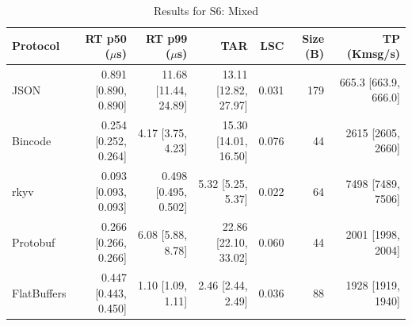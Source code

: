\begin{table}[htbp]
\centering
\caption{Results for S6: Mixed}
\label{tab:results_mixed}
\begin{tabular}{l r r r r r r}
\hline
Protocol & RT p50 ($\mu$s) & RT p99 ($\mu$s) & TAR & LSC & Size (B) & TP (Kmsg/s) \\
\hline
  JSON & 0.891 [0.890, 0.890] & 11.68 [11.44, 24.89] & 13.11 [12.82, 27.97] & 0.031 & 179 & 665.3 [663.9, 666.0] \\
  Bincode & 0.254 [0.252, 0.264] & 4.17 [3.75, 4.23] & 15.30 [14.01, 16.50] & 0.076 & 44 & 2615 [2605, 2660] \\
  rkyv & 0.093 [0.093, 0.093] & 0.498 [0.495, 0.502] & 5.32 [5.25, 5.37] & 0.022 & 64 & 7498 [7489, 7506] \\
  Protobuf & 0.266 [0.266, 0.266] & 6.08 [5.88, 8.78] & 22.86 [22.10, 33.02] & 0.060 & 44 & 2001 [1998, 2004] \\
  FlatBuffers & 0.447 [0.443, 0.450] & 1.10 [1.09, 1.11] & 2.46 [2.44, 2.49] & 0.036 & 88 & 1928 [1919, 1940] \\
\hline
\end{tabular}
\end{table}